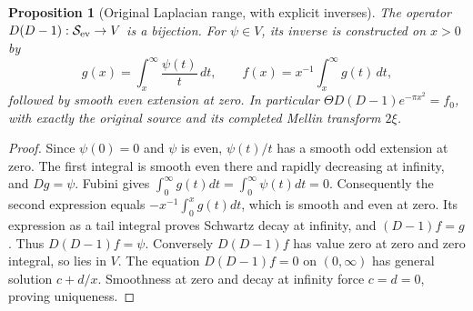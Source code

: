 \documentclass[11pt]{article}
\newtheorem{proposition}[theorem]{Proposition}
\begin{document}
\begin{proposition}[Original Laplacian range, with explicit inverses]
The operator $D(D-1):\mathcal S_{\rm ev}\to V$ is a bijection.
For $\psi\in V$, its inverse is constructed on $x>0$ by
\[
 g(x)=\int_x^\infty\frac{\psi(t)}t\,dt,
 \qquad f(x)=x^{-1}\int_x^\infty g(t)\,dt,
 \tag{E4}
\]
followed by smooth even extension at zero. In particular
$\Theta D(D-1)e^{-\pi x^2}=f_0$, with exactly the original source
and its completed Mellin transform $2\xi$.
\end{proposition}
\begin{proof}
Since $\psi(0)=0$ and $\psi$ is even, $\psi(t)/t$ has a smooth odd
extension at zero. The first integral is smooth even there and rapidly
decreasing at infinity, and $Dg=\psi$. Fubini gives
$\int_0^\infty g(t)dt=\int_0^\infty\psi(t)dt=0$.
Consequently the second expression equals
$-x^{-1}\int_0^xg(t)dt$, which is smooth and even at zero.
Its expression as a tail integral proves Schwartz decay at infinity,
and $(D-1)f=g$. Thus $D(D-1)f=\psi$.
Conversely $D(D-1)f$ has value zero at zero and zero integral, so lies
in $V$. The equation $D(D-1)f=0$ on $(0,\infty)$ has general solution
$c+d/x$. Smoothness at zero and decay at infinity force $c=d=0$,
proving uniqueness.
\end{proof}
\end{document}

